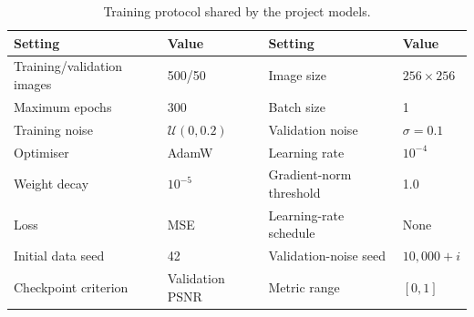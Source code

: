 \begin{table}[htbp]
\centering
\caption{Training protocol shared by the project models.}
\label{tab:training_protocol}
\begin{tabular}{llll}
\toprule
Setting & Value & Setting  & Value  \\
\midrule
Training/validation images & 500/50 & Image size & $256\times256$ \\
Maximum epochs & 300 & Batch size & 1 \\
Training noise & $\mathcal{U}(0,0.2)$ & Validation noise & $\sigma=0.1$ \\
Optimiser & AdamW & Learning rate & $10^{-4}$ \\
Weight decay & $10^{-5}$ & Gradient-norm threshold & 1.0 \\
Loss & MSE & Learning-rate schedule & None \\
Initial data seed & 42 & Validation-noise seed & $10{,}000+i$ \\
Checkpoint criterion & Validation PSNR & Metric range & $[0,1]$ \\
\bottomrule
\end{tabular}
\end{table}
